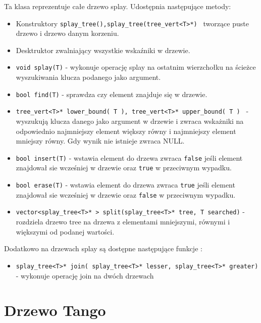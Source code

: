 \documentclass[declaration,shortabstract]{iithesis}
\theoremstyle{thm}
\theoremstyle{remark}
\theoremstyle{plain}
\theoremstyle{plain}
\theoremstyle{plain}
\begin{document}
Ta klasa reprezentuje całe drzewo splay. Udostępnia następujące metody: 

\begin{itemize}

\item{Konstruktory \texttt{splay\_tree(),splay\_tree(tree\_vert<T>*) } tworzące puste drzewo i drzewo danym korzeniu. }

\item{Desktruktor zwalniający wszystkie wskaźniki w drzewie.}

\item{\texttt{void splay(T)} - wykonuje operację splay na ostatnim wierzchołku na ścieżce wyszukiwania klucza podanego jako argument.}

\item{\texttt{bool find(T)} - sprawdza czy element znajduje się w drzewie.}
    
\item{\texttt{tree\_vert<T>* lower\_bound( T ), tree\_vert<T>* upper\_bound( T ) } - wyszukują klucza danego jako argument w drzewie i zwraca wskażniki na odpowiednio najmniejszy element większy równy i najmniejszy element mniejszy równy. Gdy wynik nie istnieje zwraca NULL. }
   
\item{\texttt{bool insert(T)} - wstawia element do drzewa zwraca \texttt{false} jeśli element znajdował sie wcześniej w drzewie oraz \texttt{true} w przeciwnym wypadku.}
\item{\texttt{bool erase(T)} - wstawia element do drzewa zwraca \texttt{true} jeśli element znajdował sie wcześniej w drzewie oraz \texttt{false} w przeciwnym wypadku.}
\item{\texttt{vector<splay\_tree<T>* > split(splay\_tree<T>* tree, T searched)} - rozdziela drzewo tree na drzewa z elementami mniejszymi, równymi i większymi od podanej wartości.}

\end{itemize}

Dodatkowo na drzewach splay są dostępne następujące funkcje : 

\begin{itemize}


\item{\texttt{splay\_tree<T>* join( splay\_tree<T>* lesser, splay\_tree<T>* greater)} - wykonuje operację join na dwóch drzewach}

\end{itemize}

\chapter{ Drzewo Tango}
\end{document}
